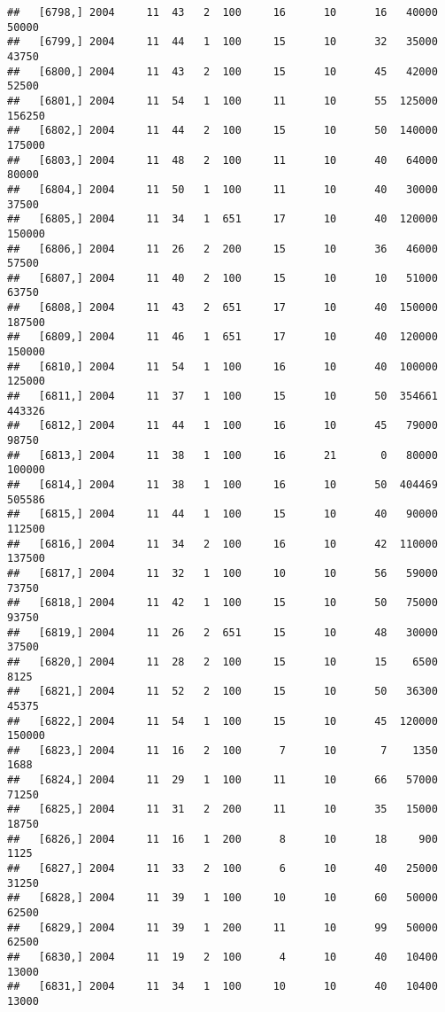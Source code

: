 \documentclass{article}\usepackage[]{graphicx}\usepackage[]{color}
\makeatletter
\newenvironment{kframe}{%
 \def\at@end@of@kframe{}%
 \ifinner\ifhmode%
  \def\at@end@of@kframe{\end{minipage}}%
  \begin{minipage}{\columnwidth}%
 \fi\fi%
 \def\FrameCommand##1{\hskip\@totalleftmargin \hskip-\fboxsep
 \colorbox{shadecolor}{##1}\hskip-\fboxsep
     \hskip-\linewidth \hskip-\@totalleftmargin \hskip\columnwidth}%
 \MakeFramed {\advance\hsize-\width
   \@totalleftmargin\z@ \linewidth\hsize
   \@setminipage}}%
 {\par\unskip\endMakeFramed%
 \at@end@of@kframe}
\newenvironment{knitrout}{}{} %
\makeatother
\begin{document}
\begin{knitrout}
\begin{kframe}
\begin{verbatim}
##   [6798,] 2004     11  43   2  100     16      10      16   40000   50000
##   [6799,] 2004     11  44   1  100     15      10      32   35000   43750
##   [6800,] 2004     11  43   2  100     15      10      45   42000   52500
##   [6801,] 2004     11  54   1  100     11      10      55  125000  156250
##   [6802,] 2004     11  44   2  100     15      10      50  140000  175000
##   [6803,] 2004     11  48   2  100     11      10      40   64000   80000
##   [6804,] 2004     11  50   1  100     11      10      40   30000   37500
##   [6805,] 2004     11  34   1  651     17      10      40  120000  150000
##   [6806,] 2004     11  26   2  200     15      10      36   46000   57500
##   [6807,] 2004     11  40   2  100     15      10      10   51000   63750
##   [6808,] 2004     11  43   2  651     17      10      40  150000  187500
##   [6809,] 2004     11  46   1  651     17      10      40  120000  150000
##   [6810,] 2004     11  54   1  100     16      10      40  100000  125000
##   [6811,] 2004     11  37   1  100     15      10      50  354661  443326
##   [6812,] 2004     11  44   1  100     16      10      45   79000   98750
##   [6813,] 2004     11  38   1  100     16      21       0   80000  100000
##   [6814,] 2004     11  38   1  100     16      10      50  404469  505586
##   [6815,] 2004     11  44   1  100     15      10      40   90000  112500
##   [6816,] 2004     11  34   2  100     16      10      42  110000  137500
##   [6817,] 2004     11  32   1  100     10      10      56   59000   73750
##   [6818,] 2004     11  42   1  100     15      10      50   75000   93750
##   [6819,] 2004     11  26   2  651     15      10      48   30000   37500
##   [6820,] 2004     11  28   2  100     15      10      15    6500    8125
##   [6821,] 2004     11  52   2  100     15      10      50   36300   45375
##   [6822,] 2004     11  54   1  100     15      10      45  120000  150000
##   [6823,] 2004     11  16   2  100      7      10       7    1350    1688
##   [6824,] 2004     11  29   1  100     11      10      66   57000   71250
##   [6825,] 2004     11  31   2  200     11      10      35   15000   18750
##   [6826,] 2004     11  16   1  200      8      10      18     900    1125
##   [6827,] 2004     11  33   2  100      6      10      40   25000   31250
##   [6828,] 2004     11  39   1  100     10      10      60   50000   62500
##   [6829,] 2004     11  39   1  200     11      10      99   50000   62500
##   [6830,] 2004     11  19   2  100      4      10      40   10400   13000
##   [6831,] 2004     11  34   1  100     10      10      40   10400   13000

\end{verbatim}
\end{kframe}
\end{knitrout}
\end{document}
